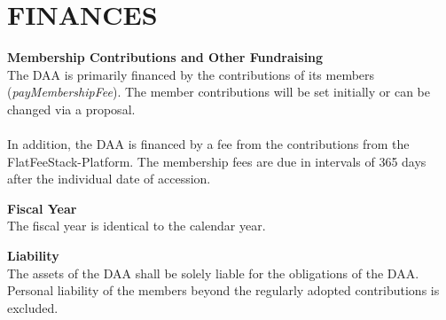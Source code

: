 \section{FINANCES}\label{sec:finances}

\item \textbf{Membership Contributions and Other Fundraising} \\
The DAA is primarily financed by the contributions of its members (\emph{payMembershipFee}).
The member contributions will be set initially or can be changed via a proposal. \\ \\
In addition, the DAA is financed by a fee from the contributions from the FlatFeeStack-Platform.
The membership fees are due in intervals of 365 days after the individual date of accession.

\item \textbf{Fiscal Year} \\
The fiscal year is identical to the calendar year.

\item \textbf{Liability} \\
The assets of the DAA shall be solely liable for the obligations of the DAA.
Personal liability of the members beyond the regularly adopted contributions is excluded.
